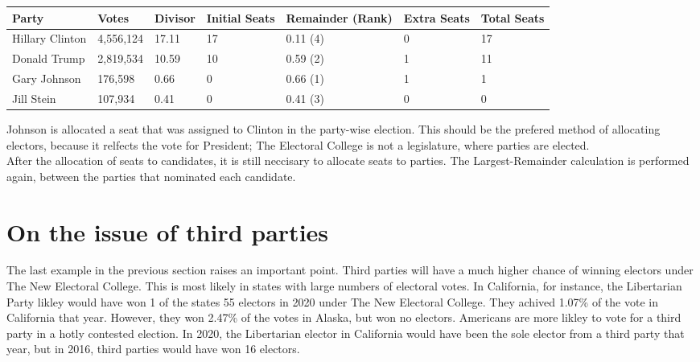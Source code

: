 \documentclass{article}
\begin{document}
    \begin{adjustbox}{center}
    \begin{tabular}{ |l|l|l|l|l|l|l| }
        \hline
        Party & Votes & Divisor & Initial Seats & Remainder (Rank) & Extra Seats & Total Seats \\
        \hline
        Hillary Clinton & 4,556,124 & 17.11 & 17 & 0.11 (4) & 0 & 17 \\
        \hline
        Donald Trump & 2,819,534 & 10.59 & 10 & 0.59 (2) & 1 & 11 \\
        \hline
        Gary Johnson & 176,598 & 0.66 & 0 & 0.66 (1) & 1 & 1 \\
        \hline
        Jill Stein & 107,934 & 0.41 & 0 & 0.41 (3) & 0 & 0 \\
        \hline
    \end{tabular}
    \end{adjustbox}

    Johnson is allocated a seat that was assigned to Clinton in the party-wise election. This should be the prefered method of allocating electors, because it relfects the vote for President; The Electoral College is not a legislature, where parties are elected.\\
    
    After the allocation of seats to candidates, it is still neccisary to allocate seats to parties. The Largest-Remainder calculation is performed again, between the parties that nominated each candidate.\\

    \section{On the issue of third parties}%

    The last example in the previous section raises an important point. Third parties will have a much higher chance of winning electors under The New Electoral College. This is most likely in states with large numbers of electoral votes. In California, for instance, the Libertarian Party likley would have won 1 of the states 55 electors in 2020 under The New Electoral College. They achived 1.07\% of the vote in California that year. However, they won 2.47\% of the votes in Alaska, but won no electors. Americans are more likley to vote for a third party in a hotly contested election. In 2020, the Libertarian elector in California would have been the sole elector from a third party that year, but in 2016, third parties would have won 16 electors.\\
\end{document}
